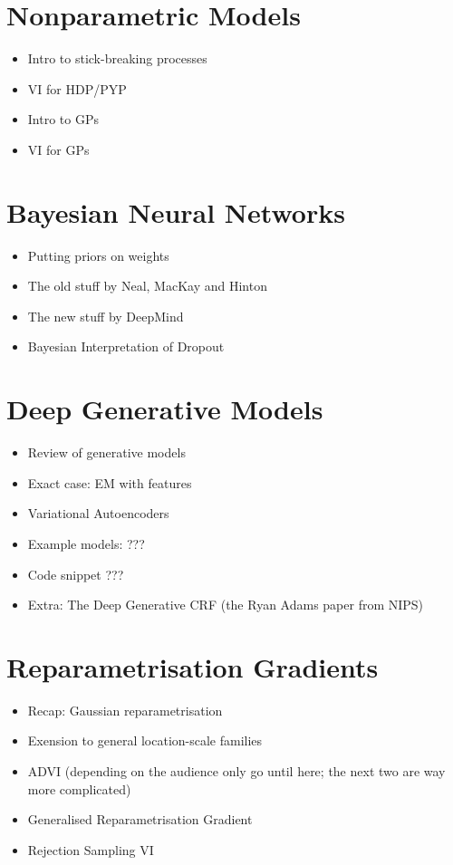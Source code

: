 \documentclass[11pt, a4paper]{article}
\begin{document}
\section{Nonparametric Models}
\begin{itemize}
\item Intro to stick-breaking processes
\item VI for HDP/PYP
\item Intro to GPs
\item VI for GPs
\end{itemize}

\section{Bayesian Neural Networks}
\begin{itemize}
\item Putting priors on weights
\item The old stuff by Neal, MacKay and Hinton
\item The new stuff by DeepMind
\item Bayesian Interpretation of Dropout
\end{itemize}

\section{Deep Generative Models}
\begin{itemize}
\item Review of generative models
\item Exact case: EM with features
\item Variational Autoencoders
\item Example models: ???
\item Code snippet ???
\item Extra: The Deep Generative CRF (the Ryan Adams paper from NIPS)
\end{itemize}

\section{Reparametrisation Gradients}
\begin{itemize}
\item Recap: Gaussian reparametrisation
\item Exension to general location-scale families
\item ADVI (depending on the audience only go until here; the next two are way more complicated)
\item Generalised Reparametrisation Gradient
\item Rejection Sampling VI
\end{itemize}
\end{document}
